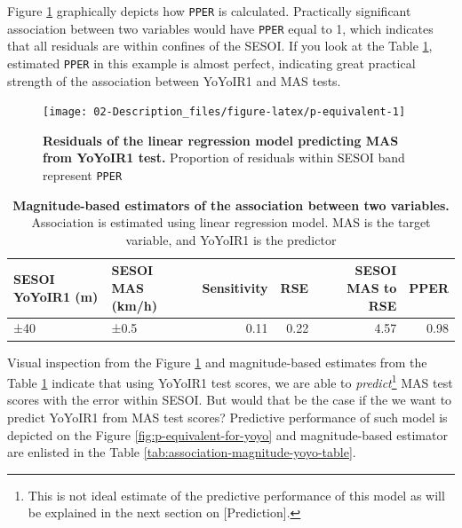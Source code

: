 \documentclass[
]{book}
\begin{document}
Figure \ref{fig:p-equivalent} graphically depicts how \texttt{PPER} is calculated. Practically significant association between two variables would have \texttt{PPER} equal to 1, which indicates that all residuals are within confines of the SESOI. If you look at the Table \ref{tab:association-magnitude-table}, estimated \texttt{PPER} in this example is almost perfect, indicating great practical strength of the association between YoYoIR1 and MAS tests.

\begin{figure}

{\centering \texttt{[image: 02-Description\_files/figure-latex/p-equivalent-1]} 

}

\caption{\textbf{Residuals of the linear regression model predicting MAS from YoYoIR1 test. }Proportion of residuals within SESOI band represent \texttt{PPER}}\label{fig:p-equivalent}
\end{figure}





\begin{table}

\caption{\label{tab:association-magnitude-table}\textbf{Magnitude-based estimators of the association between two variables.} Association is estimated using linear regression model. MAS is the target variable, and YoYoIR1 is the predictor}
\centering
\begin{tabular}[t]{llrrrr}
\toprule
SESOI YoYoIR1 (m) & SESOI MAS (km/h) & Sensitivity & RSE & SESOI MAS to RSE & PPER\\
\midrule
±40 & ±0.5 & 0.11 & 0.22 & 4.57 & 0.98\\
\bottomrule
\end{tabular}
\end{table}

Visual inspection from the Figure \ref{fig:p-equivalent} and magnitude-based estimates from the Table \ref{tab:association-magnitude-table} indicate that using YoYoIR1 test scores, we are able to \emph{predict}\footnote{This is not ideal estimate of the predictive performance of this model as will be explained in the next section on {[}Prediction{]}.} MAS test scores with the error within SESOI. But would that be the case if the we want to predict YoYoIR1 from MAS test scores? Predictive performance of such model is depicted on the Figure \ref{fig:p-equivalent-for-yoyo} and magnitude-based estimator are enlisted in the Table \ref{tab:association-magnitude-yoyo-table}.
\end{document}
